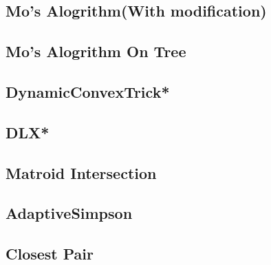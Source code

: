 \subsection{Mo's Alogrithm(With modification)}

\subsection{Mo's Alogrithm On Tree}

\subsection{DynamicConvexTrick*} %

\subsection{DLX*} %

\subsection{Matroid Intersection}

\subsection{AdaptiveSimpson}

\subsection{Closest Pair}

